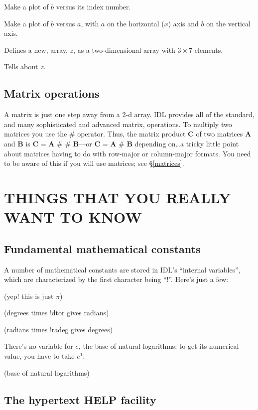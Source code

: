 \documentclass[psfig,preprint]{aastex}
\begin{document}
 Make a plot of $b$ versus its index number. 

 Make a plot of $b$ versus $a$, with $a$ on
the horizontal ($x$) axis and $b$ on the vertical axis. 

 Defines a new, array, $z$, as a
two-dimensional array with $3 \times 7$ elements. 

 Tells about $z$. 

\subsection{Matrix operations}

	A matrix is just one step away from a 2-d array. IDL provides
all of the standard, and many sophisticated and advanced matrix,
operations. To multiply two matrices you use the $\#$ operator. Thus, the
matrix product {\bf C} of two matrices {\bf A} and {\bf B} is {\bf C} =
{\bf A} \# \# {\bf B}---or {\bf C} = {\bf A} \# {\bf B} depending on\dots a
tricky little point about matrices having to do with row-major or
column-major formats. You need to be aware of this if you will use
matrices; see \S \ref{matrices}. 

\section {THINGS THAT YOU REALLY WANT TO KNOW}

\subsection{ Fundamental mathematical constants}

       A number of mathematical constants are stored in IDL's
``internal variables'', which are characterized by the first character
being ``!''. Here's just a few:

 (yep! this is just $\pi$)

 (degrees times !dtor gives radians)

 (radians times !radeg gives degrees)

\noindent There's no variable for $e$, the base of natural logarithms;
to get its numerical value, you have to take $e^1$:

 (base of natural logarithms)

\subsection {The hypertext HELP facility}
\end{document}
